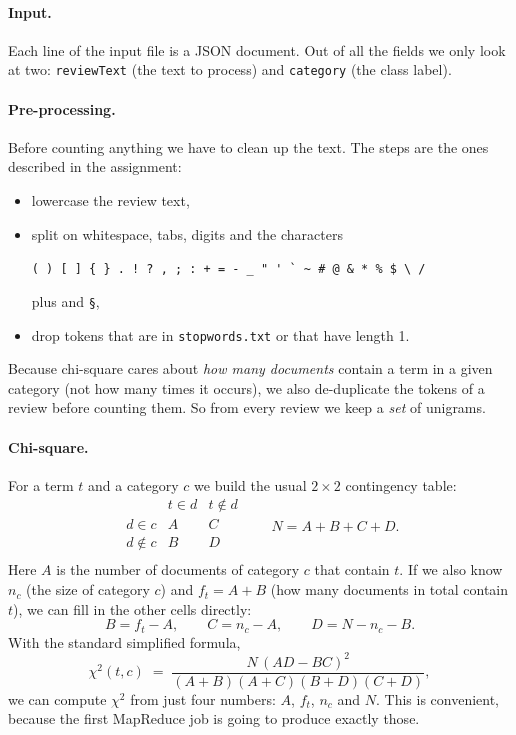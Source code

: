 \documentclass[11pt,a4paper]{article}
\begin{document}
\paragraph{Input.}  Each line of the input file is a JSON document. Out of all
the fields we only look at two: \texttt{reviewText} (the text to process)
and \texttt{category} (the class label).

\paragraph{Pre-processing.}  Before counting anything we have to clean up
the text. The steps are the ones described in the assignment:

\begin{itemize}
  \item lowercase the review text,
  \item split on whitespace, tabs, digits and the characters
    \begin{center}\footnotesize
    \verb|( ) [ ] { } . ! ? , ; : + = - _ " ' ` ~ # @ & * % $ \ /|
    \end{center}
    plus \texttt{\texteuro} and \texttt{\S},
  \item drop tokens that are in \texttt{stopwords.txt} or that have
    length 1.
\end{itemize}

Because chi-square cares about \emph{how many documents} contain a term
in a given category (not how many times it occurs), we also de-duplicate
the tokens of a review before counting them. So from every review we
keep a \emph{set} of unigrams.

\paragraph{Chi-square.}  For a term $t$ and a category $c$ we build the usual
$2\times 2$ contingency table:
\[
\begin{array}{c|cc}
               & t\in d      & t\notin d    \\ \hline
d\in c         & A           & C            \\
d\notin c      & B           & D            \\
\end{array}
\qquad N=A+B+C+D.
\]
Here $A$ is the number of documents of category $c$ that contain $t$.
If we also know $n_c$ (the size of category $c$) and $f_t = A+B$ (how
many documents in total contain $t$), we can fill in the other cells
directly:
\[
B = f_t - A,\qquad C = n_c - A,\qquad D = N - n_c - B.
\]
With the standard simplified formula,
\begin{equation}
    \chi^{2}(t,c) \;=\; \frac{N\,(AD-BC)^{2}}{(A+B)(A+C)(B+D)(C+D)},
    \label{eq:chi2}
\end{equation}
we can compute $\chi^2$ from just four numbers: $A$, $f_t$, $n_c$ and
$N$. This is convenient, because the first MapReduce job is going to
produce exactly those.
\end{document}
